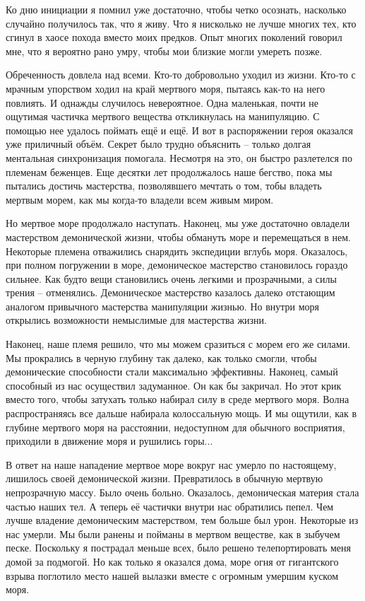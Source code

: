 \documentclass[12pt,a4paper]{article}
\begin{document}
Ко дню инициации я помнил уже достаточно, чтобы четко осознать, насколько случайно получилось так, что я живу. Что я нисколько не лучше многих тех, кто сгинул в хаосе похода вместо моих предков. Опыт многих поколений говорил мне, что я вероятно рано умру, чтобы мои близкие могли умереть позже.

Обреченность довлела над всеми. Кто-то добровольно уходил из жизни. Кто-то с мрачным упорством ходил на край мертвого моря, пытаясь как-то на него повлиять. И однажды случилось невероятное. Одна маленькая, почти не ощутимая частичка мертвого вещества откликнулась на манипуляцию. С помощью нее удалось поймать ещё и ещё. И вот в распоряжении героя оказался уже приличный объём. Секрет было трудно объяснить -- только долгая ментальная синхронизация помогала. Несмотря на это, он быстро разлетелся по племенам беженцев. Еще десятки лет продолжалось наше бегство, пока мы пытались достичь мастерства, позволявшего мечтать о том, тобы владеть мертвым морем, как мы когда-то владели всем живым миром.

Но мертвое море продолжало наступать. Наконец, мы уже достаточно овладели мастерством демонической жизни, чтобы обмануть море и перемещаться в нем. Некоторые племена отважились снарядить экспедиции вглубь моря. Оказалось, при полном погружении в море, демоническое мастерство становилось гораздо сильнее. Как будто вещи становились очень легкими и прозрачными, а силы трения -- отменялись. Демоническое мастерство казалось далеко отстающим аналогом привычного мастерства манипуляции жизнью. Но внутри моря открылись возможности немыслимые для мастерства жизни.

Наконец, наше племя решило, что мы можем сразиться с морем его же силами. Мы прокрались в черную глубину так далеко, как только смогли, чтобы демонические способности стали максимально эффективны. Наконец, самый способный из нас осуществил задуманное. Он как бы закричал. 
Но этот крик вместо того, чтобы затухать только набирал силу в среде мертвого моря. Волна распространяясь все дальше набирала колоссальную мощь. И мы ощутили, как в глубине мертвого моря на расстоянии, недоступном для обычного восприятия, приходили в движение моря и рушились горы...

В ответ на наше нападение мертвое море вокруг нас умерло по настоящему, лишилось своей демонической жизни. Превратилось в обычную мертвую непрозрачную массу. Было очень больно. Оказалось, демоническая материя стала частью наших тел. А теперь её частички внутри нас обратились пепел. Чем лучше владение демоническим мастерством, тем больше был урон. Некоторые из нас умерли. Мы были ранены и пойманы в мертвом веществе, как в зыбучем песке. Поскольку я пострадал меньше всех, было решено телепортировать меня домой за подмогой. Но как только я оказался дома, море огня от гигантского взрыва поглотило место нашей вылазки вместе с огромным умершим куском моря.
\end{document}

